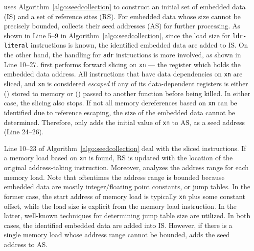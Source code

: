 \NDisassembler uses Algorithm~\ref{algo:seedcollection} to construct an initial set of embedded data (IS) and a set of reference sites (RS).
For embedded data whose size cannot be precisely bounded, \NDisassembler collects their seed addresses (AS) for further processing.
As shown in Line 5--9 in Algorithm~\ref{algo:seedcollection}, since the load size for {\tt ldr-literal} instructions is known, the identified embedded data are added to 
IS. On the other hand, the handling for {\tt adr} instructions is more involved, as shown in Line 10--27. \NDisassembler first performs forward slicing on {\tt xn} --- 
the register which holds the embedded data address. All instructions that have data dependencies on {\tt xn} are sliced, and {\tt xn} is considered {\em escaped} if 
any of its data-dependent registers is either () stored to memory or () passed to another function before being killed. In either case, the slicing also stops. If not all memory
dereferences based on {\tt xn} can be identified due to reference escaping, the size of the embedded data cannot be determined. Therefore, \NDisassembler only adds the initial value of {\tt xn} to 
AS, as a seed address (Line 24--26).

Line 10--23 of Algorithm~\ref{algo:seedcollection} deal with the sliced instructions. If a memory load based on {\tt xn} is found, RS is updated with the location of the original
address-taking instruction. Moreover, \NDisassembler analyzes the address range for each memory load. Note that oftentimes the address range is bounded because embedded data are mostly integer/floating point constants, or jump tables. In the former case, the start address of memory load is typically {\tt xn} plus some constant offset, while the load size is explicit from the memory load instruction. In the latter, well-known techniques for determining jump table size \cite{jump-table-analysis} are utilized. 
In both cases, the identified embedded data are added into IS. However, if there is a single memory load whose address range cannot be bounded, \NDisassembler adds the seed address to AS. 


